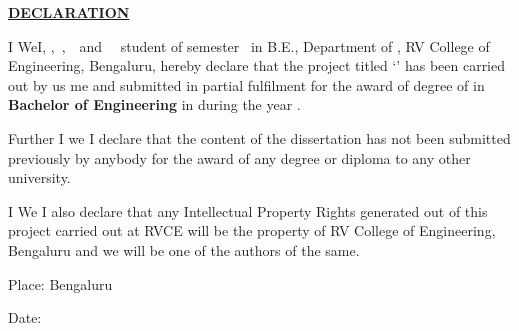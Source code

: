 
\thispagestyle{empty}

\begin{center}
\Large\textbf{\underline{DECLARATION}} \par
\end{center}


\noindent \ifPG I \else \ifStuNameBUsed We\else I\fi\fi, \textbf{\printStuNameA} \ifPG \else\ifStuNameBUsed  \ifStuNameCUsed ,$\,$ \fi \textbf{\printStuNameB} \ifStuNameCUsed  \ifStuNameDUsed ,$\,$ \fi \textbf{\printStuNameC}$\,$ \ifStuNameDUsed and $\,$ \textbf{\printStuNameD}$\,$ \fi \fi \fi \fi student of \ifPG {}  \fi \else {}\fi \fi semester \ifPG \printMastersInSF\, in \printMastersPrgName \else B.E.\fi, Department of \printDepartmentLF, RV College of Engineering, Bengaluru, hereby declare that the \fi project titled `\textbf{\printTitle}' has been carried out by \ifStuNameBUsed us \else me \fi and submitted in partial fulfilment for the award of degree of \ifPG \textbf{\printMastersInLF} in \textbf{\printMastersPrgName} \else\textbf{Bachelor of Engineering} in \textbf{\printDepartmentLF} \fi during the year \printAcadYear.\\ \par

\noindent Further \ifPG I \else\ifStuNameBUsed we \else I \fi \fi declare that the content of the dissertation has not been submitted previously by anybody for the award of any degree or diploma to any other university.\\ \par

\noindent \ifPG I \else\ifStuNameBUsed We \else I \fi \fi also declare that any Intellectual Property Rights generated out of this project carried out at RVCE will be the property of RV College of Engineering, Bengaluru and we will be one of the authors of the same.

\vspace{1cm}
\noindent Place: Bengaluru\par
\vspace{0.5cm}
\noindent Date: \par

